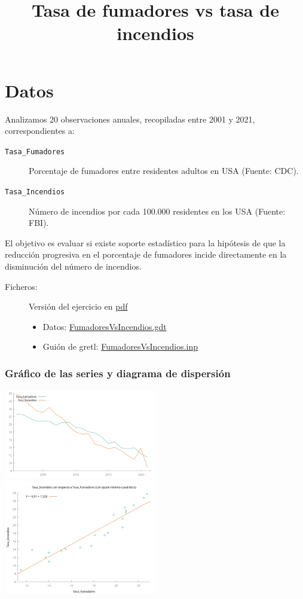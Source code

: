\documentclass[10pt]{article}
\date{}
\title{Tasa de fumadores vs tasa de incendios}
\begin{document}
\maketitle
\section*{Datos}
\label{sec:org9eb59b0}

Analizamos 20 observaciones anuales, recopiladas entre 2001 y 2021, correspondientes a:

\begin{description}
\item[{\texttt{Tasa\_Fumadores}}] Porcentaje de fumadores entre residentes adultos en USA (Fuente: CDC).
\item[{\texttt{Tasa\_Incendios}}] Número de incendios por cada 100.000 residentes en los USA (Fuente: FBI).
\end{description}

El objetivo es evaluar si existe soporte estadístico para la hipótesis de que la reducción progresiva en el porcentaje de fumadores incide directamente en la disminución del número de incendios. 

\begin{description}
\item[{Ficheros:}] Versión del ejercicio en \href{https://github.com/mbujosab/EconometriaAplicada-SRC/blob/main/FumadoresVsIncendios.pdf}{pdf}
\begin{itemize}
\item Datos: \url{FumadoresVsIncendios.gdt}
\item Guión de gretl: \url{FumadoresVsIncendios.inp}
\end{itemize}
\end{description}
\subsubsection*{Gráfico de las series y diagrama de dispersión}
\label{sec:org64872da}

\includegraphics[width=0.5\textwidth]{./FumadoresVsIncendios/Tasa_FumadoresyTasa_Incendios.png} \includegraphics[width=0.5\textwidth]{./FumadoresVsIncendios/Tasa_IncendiosVsTasa_Fumadores.png}
\end{document}
